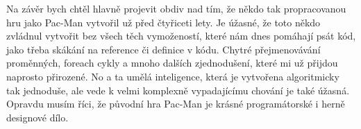\documentclass[a4]{article}
\begin{document}
Na závěr bych chtěl hlavně projevit obdiv nad tím, že někdo tak propracovanou hru jako Pac-Man vytvořil už před čtyřiceti lety. Je úžasné, že toto někdo zvládnul vytvořit bez všech těch vymožeností, které nám dnes pomáhají psát kód, jako třeba skákání na reference či definice v kódu. Chytré přejmenovávání proměnných, foreach cykly a mnoho dalších zjednodušení, které mi už přijdou naprosto přirozené. No a ta umělá inteligence, která je vytvořena algoritmicky tak jednoduše, ale vede k velmi komplexně vypadajícímu chování je také úžasná. Opravdu musím říci, že původní hra Pac-Man je krásné programátorské i herně designové dílo.
\end{document}
